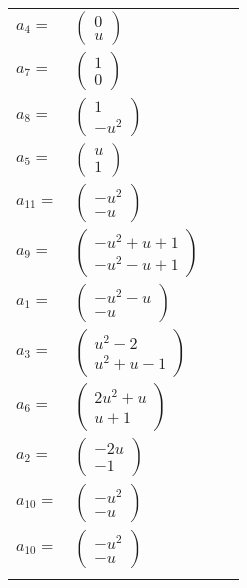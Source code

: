 \documentclass[1p]{elsarticle_modified}
\theoremstyle{definition}
\begin{document}
\begin{tabular}{m{7pt} m{180pt} m{7pt} m{180pt} }
\flushright $a_{4}=$&$\begin{pmatrix}0\\u\end{pmatrix}$ \\
\flushright $a_{7}=$&$\begin{pmatrix}1\\0\end{pmatrix}$ \\
\flushright $a_{8}=$&$\begin{pmatrix}1\\- u^2\end{pmatrix}$ \\
\flushright $a_{5}=$&$\begin{pmatrix}u\\1\end{pmatrix}$ \\
\flushright $a_{11}=$&$\begin{pmatrix}- u^2\\- u\end{pmatrix}$ \\
\flushright $a_{9}=$&$\begin{pmatrix}- u^2+u+1\\- u^2- u+1\end{pmatrix}$ \\
\flushright $a_{1}=$&$\begin{pmatrix}- u^2- u\\- u\end{pmatrix}$ \\
\flushright $a_{3}=$&$\begin{pmatrix}u^2-2\\u^2+u-1\end{pmatrix}$ \\
\flushright $a_{6}=$&$\begin{pmatrix}2 u^2+u\\u+1\end{pmatrix}$ \\
\flushright $a_{2}=$&$\begin{pmatrix}-2 u\\-1\end{pmatrix}$ \\
\flushright $a_{10}=$&$\begin{pmatrix}- u^2\\- u\end{pmatrix}$\\ \flushright $a_{10}=$&$\begin{pmatrix}- u^2\\- u\end{pmatrix}$\\&\end{tabular}
\end{document}
